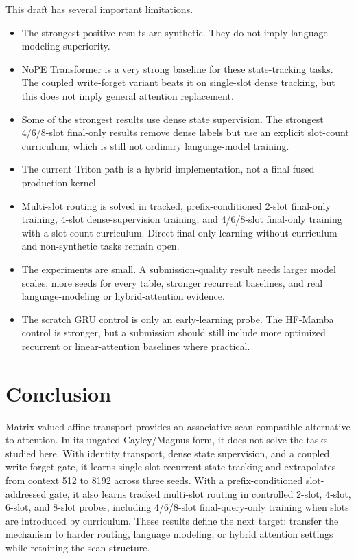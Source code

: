 \documentclass[10pt]{article}
\begin{document}
This draft has several important limitations.
\begin{itemize}
    \item The strongest positive results are synthetic. They do not imply
    language-modeling superiority.
    \item NoPE Transformer is a very strong baseline for these state-tracking
    tasks. The coupled write-forget variant beats it on single-slot dense
    tracking, but this does not imply general attention replacement.
    \item Some of the strongest results use dense state supervision. The
    strongest 4/6/8-slot final-only results remove dense labels but use an
    explicit slot-count curriculum, which is still not ordinary language-model
    training.
    \item The current Triton path is a hybrid implementation, not a final fused
    production kernel.
    \item Multi-slot routing is solved in tracked, prefix-conditioned 2-slot
    final-only training, 4-slot dense-supervision training, and 4/6/8-slot
    final-only training with a slot-count curriculum. Direct final-only
    learning without curriculum and non-synthetic tasks remain open.
    \item The experiments are small. A submission-quality result needs larger
    model scales, more seeds for every table, stronger recurrent baselines, and
    real language-modeling or hybrid-attention evidence.
    \item The scratch GRU control is only an early-learning probe. The HF-Mamba
    control is stronger, but a submission should still include more optimized
    recurrent or linear-attention baselines where practical.
\end{itemize}

\section{Conclusion}

Matrix-valued affine transport provides an associative scan-compatible
alternative to attention. In its ungated Cayley/Magnus form, it does not solve
the tasks studied here. With identity transport, dense state supervision, and
a coupled write-forget gate, it learns single-slot recurrent state tracking and
extrapolates from context 512 to 8192 across three seeds. With a
prefix-conditioned slot-addressed gate, it also learns tracked multi-slot
routing in controlled 2-slot, 4-slot, 6-slot, and 8-slot probes, including
4/6/8-slot final-query-only training when slots are introduced by curriculum.
These results define the next target: transfer the mechanism to harder routing,
language modeling, or hybrid attention settings while retaining the scan
structure.



\end{document}

